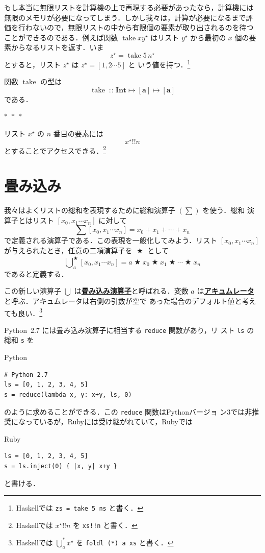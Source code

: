 \documentclass[a5paper,twoside,fleqn,draft]{jsbook}
\newcommand{\separator}{\begin{center}$*$~$*$~$*$\end{center}}
\newcommand{\programminglanguage}[1]{\textsf{#1}}
\newcommand{\haskell}{\programminglanguage{Haskell}}
\newcommand{\python}{\programminglanguage{Python}}
\newcommand{\ruby}{\programminglanguage{Ruby}}
\newcommand{\keyword}[1]{{\underline{\textbf{#1}}}}
\newcommand{\code}[1]{\texttt{#1}}
\newenvironment{pythoncode}{\begin{itembox}[r]{\python}}{\end{itembox}}
\newenvironment{rubycode}{\begin{itembox}[r]{\ruby}}{\end{itembox}}
\newcommand{\mSpecialFunc}[1]{#1}
\DeclareMathOperator{\mTake}{\mSpecialFunc{take}}
\DeclareMathOperator{\mBinOp}{\bigstar}
\DeclareMathOperator*{\mFold}{\bigcup}
\DeclareMathOperator{\mIn}{{:\!:}}
\DeclareMathOperator{\mListAt}{!!}
\DeclareMathOperator{\mMapsTo}{\mapsto}
\newcommand{\mType}[1]{\mathbf{#1}} %
\newcommand{\mA}{\mType{a}}
\newcommand{\mIntType}{\mType{Int}}
\newcommand{\mList}[1]{{#1}^\mathrm{\star}}
\begin{document}
もし本当に無限リストを計算機の上で再現する必要があったなら，計算機には
無限のメモリが必要になってしまう．しかし我々は，計算が必要になるまで評
価を行わないので，無限リストの中から有限個の要素が取り出されるのを待つ
ことができるのである．例えば関数 $\mTake x\mList{y}$ はリスト
$\mList{y}$ から最初の $x$ 個の要素からなるリストを返す．いま
\begin{equation*}
  \mList{z}
  =\mTake5\,\mList{n}
\end{equation*}
とすると，リスト $\mList{z}$ は $\mList{z}=[1,2\dotsb5]$ と
いう値を持つ．\footnote{\haskell では \code{zs = take 5 ns} と書く．}

関数 $\mTake$ の型は
\begin{equation}
  \mTake
  \mIn\mIntType\mMapsTo[\mA]\mMapsTo[\mA]
\end{equation}
である．

\separator

リスト $\mList{x}$ の $n$ 番目の要素には
\begin{equation}
  \mList{x}\mListAt n
\end{equation}
とすることでアクセスできる．\footnote{\haskell では $\mList{x}\mListAt
  n$ を \code{xs!!n} と書く．}

\section{畳み込み}
\label{sec:convolution}

我々はよくリストの総和を表現するために総和演算子 $(\sum)$ を使う．総和
演算子とはリスト $[x_0,x_1\dotsb x_n]$ に対して
\begin{equation}
  \sum[x_0,x_1\dotsb x_n]
  =x_0+x_1+\dotsb+x_n
\end{equation}
で定義される演算子である．この表現を一般化してみよう．リスト
$[x_0,x_1\dotsb x_n]$ が与えられたとき，任意の二項演算子を
$\mBinOp$ として
\begin{equation}
  \mFold^{\mBinOp}_a[x_0,x_1\dotsb x_n]
  =a\mBinOp x_0\mBinOp x_1\mBinOp\dotsb\mBinOp x_n
\end{equation}
であると定義する．

この新しい演算子 $\mFold$ は\keyword{畳み込み演算子}と呼ばれる．変数
$a$ は\keyword{アキュムレータ}と呼ぶ．アキュムレータは右側の引数が空で
あった場合のデフォルト値と考えても良い．\footnote{\haskell では
  $\mFold^*_a\mList{x}$ を \code{foldl (*) a xs} と書く．}

\python\ 2.7 には畳み込み演算子に相当する \code{reduce} 関数があり，リ
スト \code{ls} の総和 \code{s} を
\begin{pythoncode}
\begin{verbatim}
# Python 2.7
ls = [0, 1, 2, 3, 4, 5]
s = reduce(lambda x, y: x+y, ls, 0)
\end{verbatim}
\end{pythoncode}
のように求めることができる．この \code{reduce} 関数は\python バージョ
ン3では非推奨になっているが，\ruby には受け継がれていて，\ruby では
\begin{rubycode}
\begin{verbatim}
ls = [0, 1, 2, 3, 4, 5]
s = ls.inject(0) { |x, y| x+y }
\end{verbatim}
\end{rubycode}
と書ける．
\end{document}
